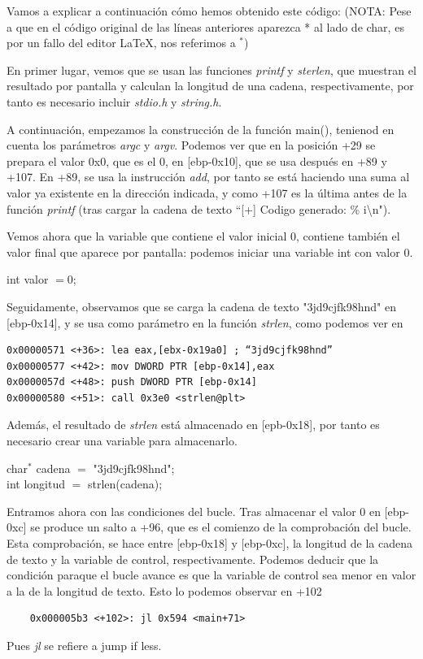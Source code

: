 \documentclass[12pt,twoside]{article}
\begin{document}
Vamos a explicar a continuación cómo hemos obtenido este código: (NOTA: Pese a que en el código original de las líneas anteriores aparezca * al lado de char, es por un fallo del editor \LaTeX, nos referimos a $^{*}$)

En primer lugar, vemos que se usan las funciones \textit{printf} y \textit{sterlen}, que muestran el resultado por pantalla y calculan la longitud de una cadena, respectivamente, por tanto es necesario incluir \textit{stdio.h} y \textit{string.h}. 

A continuación, empezamos la construcción de la función main(), tenienod en cuenta los parámetros \textit{argc} y \textit{argv}. Podemos ver que en la posición +29 se prepara el valor 0x0, que es el 0, en [ebp-0x10], que se usa después en +89 y +107. En +89, se usa la instrucción \textit{add}, por tanto se está haciendo una suma al valor ya existente en la dirección indicada, y como +107 es la última antes de la función \textit{printf} (tras cargar la cadena de texto “[+] Codigo generado: \% i\textbackslash n"). 

Vemos ahora que la variable que contiene el valor inicial 0, contiene también el valor final que aparece por pantalla: podemos iniciar una variable int con valor 0. 

\begin{center}
int valor $= 0$;
\end{center}

Seguidamente, observamos que se carga la cadena de texto "3jd9cjfk98hnd" en  [ebp-0x14], y se usa como parámetro en la función \textit{strlen}, como podemos ver en
\begin{verbatim}
0x00000571 <+36>: lea eax,[ebx-0x19a0] ; “3jd9cjfk98hnd”
0x00000577 <+42>: mov DWORD PTR [ebp-0x14],eax
0x0000057d <+48>: push DWORD PTR [ebp-0x14]
0x00000580 <+51>: call 0x3e0 <strlen@plt>
\end{verbatim}
Además, el resultado de \textit{strlen} está almacenado en [epb-0x18], por tanto es necesario crear una variable para almacenarlo. 
\begin{center}
char$^{*}$ cadena $=$ "3jd9cjfk98hnd";\\
int longitud $=$ strlen(cadena);
\end{center}

Entramos ahora con las condiciones del bucle. Tras almacenar el valor 0 en [ebp-0xc] se produce un salto a +96, que es el comienzo de la comprobación del bucle. Esta comprobación, se hace entre [ebp-0x18] y [ebp-0xc], la longitud de la cadena de texto y la variable de control, respectivamente. Podemos deducir que la condición paraque el bucle avance es que la variable de control sea menor en valor a la de la longitud de texto. Esto lo podemos observar en +102
\begin{verbatim}
    0x000005b3 <+102>: jl 0x594 <main+71>
\end{verbatim}
Pues \textit{jl} se refiere a jump if less. 
\end{document}
